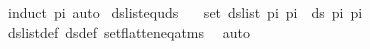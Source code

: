 \begin{isabellebody}
\ {\isacharparenleft}{\kern0pt}induct\ pi{\isacharparenright}{\kern0pt}\ auto%
\endisatagproof
{\isafoldproof}%
%
\isadelimproof
\isanewline
%
\endisadelimproof
\isanewline
{}\isamarkupfalse%
\ ds{\isacharunderscore}{\kern0pt}list{\isacharunderscore}{\kern0pt}equ{\isacharunderscore}{\kern0pt}ds{\isacharcolon}{\kern0pt}\ \isanewline
\ \ {\isachardoublequoteopen}set\ {\isacharparenleft}{\kern0pt}ds{\isacharunderscore}{\kern0pt}list\ pi{}\ pi{}{\isacharparenright}{\kern0pt}\ {\isacharequal}{\kern0pt}\ ds\ pi{}\ pi{}{\isachardoublequoteclose}\isanewline
%
\isadelimproof
\ \ %
\endisadelimproof
%
\isatagproof
{}\isamarkupfalse%
\ ds{\isacharunderscore}{\kern0pt}list{\isacharunderscore}{\kern0pt}def\ ds{\isacharunderscore}{\kern0pt}def\ set{\isacharunderscore}{\kern0pt}flatten{\isacharunderscore}{\kern0pt}eq{\isacharunderscore}{\kern0pt}atms\ \isamarkupfalse%
\ auto%
\endisatagproof
{\isafoldproof}%
%
\isadelimproof
\isanewline
%
\endisadelimproof
\isanewline
\isanewline
%
\isadelimtheory
\isanewline
%
\endisadelimtheory
%
\isatagtheory
{}\isamarkupfalse%
%
\endisatagtheory
{\isafoldtheory}%
%
\isadelimtheory
%
\endisadelimtheory
%
\end{isabellebody}%
\endinput
